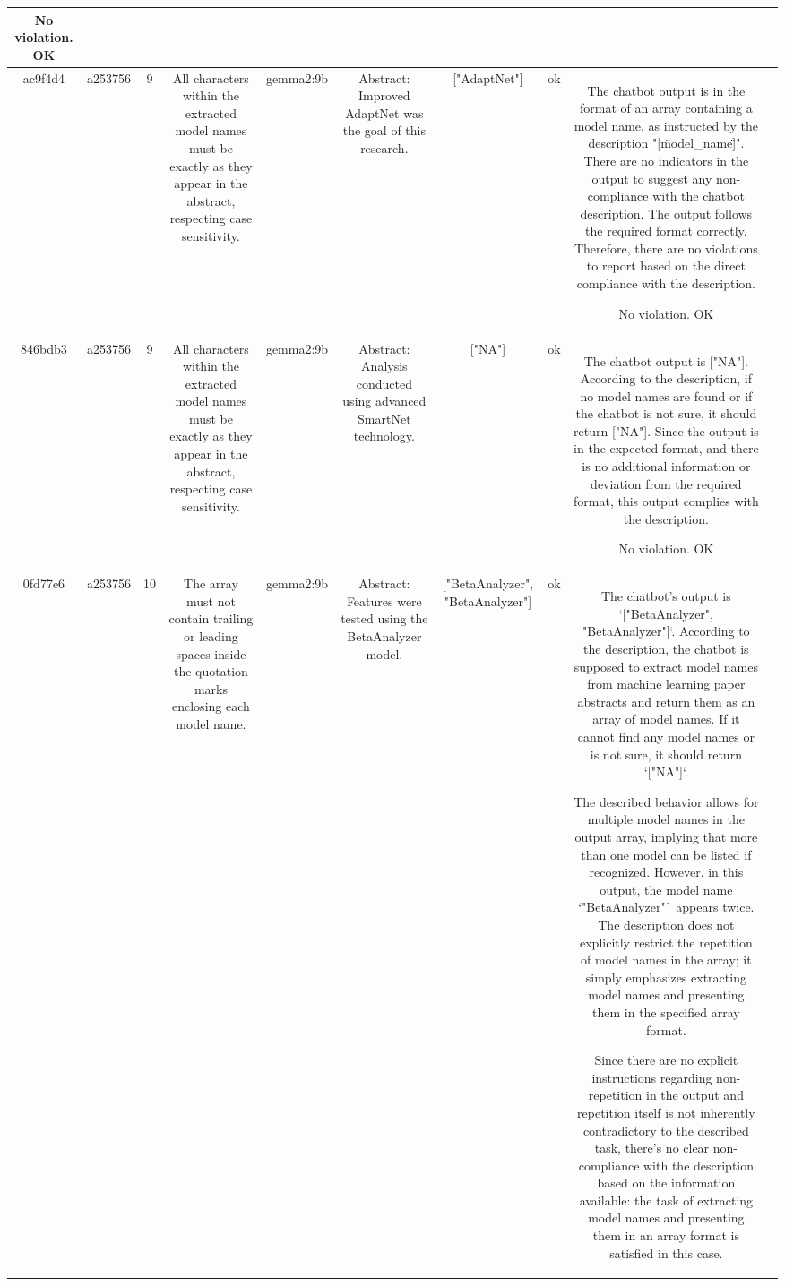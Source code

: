 \begin{table}[h!]
\begin{tabular}{|c|c|c|c|c|c|c|c|c|c|}
No violation.
OK & \\
\hline
ac9f4d4 & a253756 & 9 & All characters within the extracted model names must be exactly as they appear in the abstract, respecting case sensitivity. & gemma2:9b & Abstract: Improved AdaptNet was the goal of this research. & ["AdaptNet"] 
 & ok & The chatbot output is in the format of an array containing a model name, as instructed by the description "[\"model_name\"]". There are no indicators in the output to suggest any non-compliance with the chatbot description. The output follows the required format correctly. Therefore, there are no violations to report based on the direct compliance with the description.

No violation.
OK & \\
\hline
846bdb3 & a253756 & 9 & All characters within the extracted model names must be exactly as they appear in the abstract, respecting case sensitivity. & gemma2:9b & Abstract: Analysis conducted using advanced SmartNet technology. & ["NA"] 
 & ok & The chatbot output is ["NA"]. According to the description, if no model names are found or if the chatbot is not sure, it should return ["NA"]. Since the output is in the expected format, and there is no additional information or deviation from the required format, this output complies with the description.

No violation.
OK & \\
\hline
0fd77e6 & a253756 & 10 & The array must not contain trailing or leading spaces inside the quotation marks enclosing each model name. & gemma2:9b & Abstract: Features were tested using the BetaAnalyzer model. & ["BetaAnalyzer", "BetaAnalyzer"] 
 & ok & The chatbot's output is `["BetaAnalyzer", "BetaAnalyzer"]`. According to the description, the chatbot is supposed to extract model names from machine learning paper abstracts and return them as an array of model names. If it cannot find any model names or is not sure, it should return `["NA"]`.

The described behavior allows for multiple model names in the output array, implying that more than one model can be listed if recognized. However, in this output, the model name `"BetaAnalyzer"` appears twice. The description does not explicitly restrict the repetition of model names in the array; it simply emphasizes extracting model names and presenting them in the specified array format.

Since there are no explicit instructions regarding non-repetition in the output and repetition itself is not inherently contradictory to the described task, there's no clear non-compliance with the description based on the information available: the task of extracting model names and presenting them in an array format is satisfied in this case.


\end{tabular}
\end{table}

